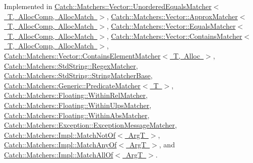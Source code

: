 Implemented in \mbox{\hyperlink{struct_catch_1_1_matchers_1_1_vector_1_1_unordered_equals_matcher_a33b685a1505a0afe06ded7e0d207bc14}{Catch\+::\+Matchers\+::\+Vector\+::\+Unordered\+Equals\+Matcher$<$ T, Alloc\+Comp, Alloc\+Match $>$}}, \mbox{\hyperlink{struct_catch_1_1_matchers_1_1_vector_1_1_approx_matcher_a760b0d1922d53b7ec327ac7418681c3f}{Catch\+::\+Matchers\+::\+Vector\+::\+Approx\+Matcher$<$ T, Alloc\+Comp, Alloc\+Match $>$}}, \mbox{\hyperlink{struct_catch_1_1_matchers_1_1_vector_1_1_equals_matcher_a398b5cc80200b3b45922c36bddcb4b37}{Catch\+::\+Matchers\+::\+Vector\+::\+Equals\+Matcher$<$ T, Alloc\+Comp, Alloc\+Match $>$}}, \mbox{\hyperlink{struct_catch_1_1_matchers_1_1_vector_1_1_contains_matcher_aa8ba33f6de86d0198b77023e1808933b}{Catch\+::\+Matchers\+::\+Vector\+::\+Contains\+Matcher$<$ T, Alloc\+Comp, Alloc\+Match $>$}}, \mbox{\hyperlink{struct_catch_1_1_matchers_1_1_vector_1_1_contains_element_matcher_a4bcd9a471271ed4dadf5db7987baeeaa}{Catch\+::\+Matchers\+::\+Vector\+::\+Contains\+Element\+Matcher$<$ T, Alloc $>$}}, \mbox{\hyperlink{struct_catch_1_1_matchers_1_1_std_string_1_1_regex_matcher_a1f788cd5258c987e5043f6c7f43adeb9}{Catch\+::\+Matchers\+::\+Std\+String\+::\+Regex\+Matcher}}, \mbox{\hyperlink{struct_catch_1_1_matchers_1_1_std_string_1_1_string_matcher_base_a47af030f8cea42a601ffb1000eea5cca}{Catch\+::\+Matchers\+::\+Std\+String\+::\+String\+Matcher\+Base}}, \mbox{\hyperlink{class_catch_1_1_matchers_1_1_generic_1_1_predicate_matcher_af7d59e94892cc09471bbaefac4c889fd}{Catch\+::\+Matchers\+::\+Generic\+::\+Predicate\+Matcher$<$ T $>$}}, \mbox{\hyperlink{struct_catch_1_1_matchers_1_1_floating_1_1_within_rel_matcher_aeabbf5394d7dafebe874fef8a959fe8a}{Catch\+::\+Matchers\+::\+Floating\+::\+Within\+Rel\+Matcher}}, \mbox{\hyperlink{struct_catch_1_1_matchers_1_1_floating_1_1_within_ulps_matcher_ad9bc8bb7f3abd326580a4bf6cf369b1b}{Catch\+::\+Matchers\+::\+Floating\+::\+Within\+Ulps\+Matcher}}, \mbox{\hyperlink{struct_catch_1_1_matchers_1_1_floating_1_1_within_abs_matcher_a206a738680f8767af31d3f1835afff3f}{Catch\+::\+Matchers\+::\+Floating\+::\+Within\+Abs\+Matcher}}, \mbox{\hyperlink{class_catch_1_1_matchers_1_1_exception_1_1_exception_message_matcher_a3543441985ec877a781e660a403b1bae}{Catch\+::\+Matchers\+::\+Exception\+::\+Exception\+Message\+Matcher}}, \mbox{\hyperlink{struct_catch_1_1_matchers_1_1_impl_1_1_match_not_of_ac5fb4ef6a9069d23a4098c3c818f06b0}{Catch\+::\+Matchers\+::\+Impl\+::\+Match\+Not\+Of$<$ Arg\+T $>$}}, \mbox{\hyperlink{struct_catch_1_1_matchers_1_1_impl_1_1_match_any_of_a315285204df93d1f8e72f50dd66eb709}{Catch\+::\+Matchers\+::\+Impl\+::\+Match\+Any\+Of$<$ Arg\+T $>$}}, and \mbox{\hyperlink{struct_catch_1_1_matchers_1_1_impl_1_1_match_all_of_acbb9a083e93b546fd33c9235b644c40f}{Catch\+::\+Matchers\+::\+Impl\+::\+Match\+All\+Of$<$ Arg\+T $>$}}.

